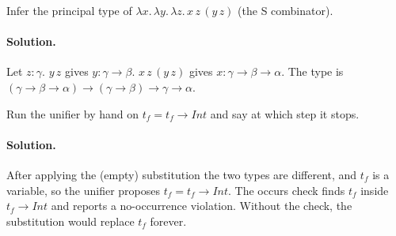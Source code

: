\begin{exercise}
Infer the principal type of $\lambda x.\, \lambda y.\, \lambda z.\, x\, z\, (y\, z)$ (the S
combinator).
\end{exercise}

\paragraph{Solution.} Let $z : \gamma$. $y\, z$ gives $y : \gamma \to \beta$. $x\, z\, (y\, z)$
gives $x : \gamma \to \beta \to \alpha$. The type is
$(\gamma \to \beta \to \alpha) \to (\gamma \to \beta) \to \gamma \to \alpha$.

\begin{exercise}
Run the unifier by hand on $t_f = t_f \to \mathit{Int}$ and say at which step it stops.
\end{exercise}

\paragraph{Solution.} After applying the (empty) substitution the two types are
different, and $t_f$ is a variable, so the unifier proposes
$t_f = t_f \to \mathit{Int}$. The occurs check finds $t_f$ inside $t_f \to \mathit{Int}$ and
reports a no-occurrence violation. Without the check, the substitution would
replace $t_f$ forever.
